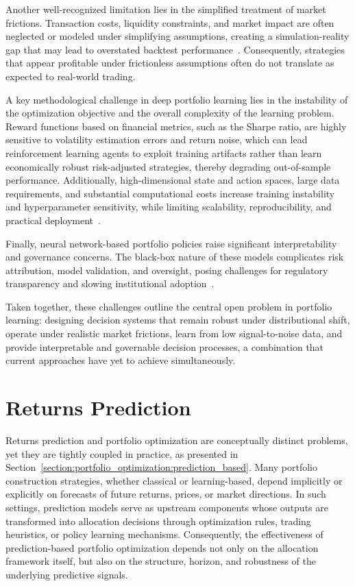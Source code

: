 Another well-recognized limitation lies in the simplified treatment of market frictions. Transaction costs, liquidity constraints, and market impact are often neglected or modeled under simplifying assumptions, creating a simulation-reality gap that may lead to overstated backtest performance~\cite{73ef4}. Consequently, strategies that appear profitable under frictionless assumptions often do not translate as expected to real-world trading.

A key methodological challenge in deep portfolio learning lies in the instability of the optimization objective and the overall complexity of the learning problem. Reward functions based on financial metrics, such as the Sharpe ratio, are highly sensitive to volatility estimation errors and return noise, which can lead reinforcement learning agents to exploit training artifacts rather than learn economically robust risk-adjusted strategies, thereby degrading out-of-sample performance. Additionally, high-dimensional state and action spaces, large data requirements, and substantial computational costs increase training instability and hyperparameter sensitivity, while limiting scalability, reproducibility, and practical deployment~\cite{03d81}.

Finally, neural network-based portfolio policies raise significant interpretability and governance concerns. The black-box nature of these models complicates risk attribution, model validation, and oversight, posing challenges for regulatory transparency and slowing institutional adoption~\cite{891a2}.

Taken together, these challenges outline the central open problem in portfolio learning: designing decision systems that remain robust under distributional shift, operate under realistic market frictions, learn from low signal-to-noise data, and provide interpretable and governable decision processes, a combination that current approaches have yet to achieve simultaneously.


\section{Returns Prediction}
\label{section:returns_prediction}

Returns prediction and portfolio optimization are conceptually distinct problems, yet they are tightly coupled in practice, as presented in Section~\ref{section:portfolio_optimization:prediction_based}. Many portfolio construction strategies, whether classical or learning-based, depend implicitly or explicitly on forecasts of future returns, prices, or market directions. In such settings, prediction models serve as upstream components whose outputs are transformed into allocation decisions through optimization rules, trading heuristics, or policy learning mechanisms. Consequently, the effectiveness of prediction-based portfolio optimization depends not only on the allocation framework itself, but also on the structure, horizon, and robustness of the underlying predictive signals.


